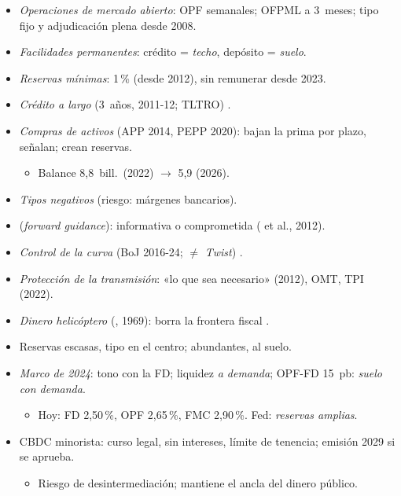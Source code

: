 \documentclass{article}
\begin{document}
\begin{columnas}
\begin{itemize}
\item \emph{Operaciones de mercado abierto}: OPF semanales; OFPML a 3~meses; tipo fijo y adjudicación plena desde 2008.
\item \emph{Facilidades permanentes}: crédito = \emph{techo}, depósito = \emph{suelo}.
\item \emph{Reservas mínimas}: 1\,\% (desde 2012), sin remunerar desde 2023.
\end{itemize}
\begin{itemize}
\item \emph{Crédito a largo} (3~años, 2011-12; TLTRO) .
\item \emph{Compras de activos} (APP 2014, PEPP 2020): bajan la prima por plazo, señalan; crean reservas.
  \begin{itemize}
  \item Balance 8,8~bill.\ (2022) $\to$ 5,9 (2026).
  \end{itemize}
\item \emph{Tipos negativos} (riesgo: márgenes bancarios).
\item {} (\emph{forward guidance}): informativa o comprometida ( et al., 2012).
\item \emph{Control de la curva} (BoJ 2016-24; $\neq$ \emph{Twist}) .
\item \emph{Protección de la transmisión}: «lo que sea necesario» (2012), OMT, TPI (2022).
\item \emph{Dinero helicóptero} (, 1969): borra la frontera fiscal .
\end{itemize}

\begin{itemize}
\item Reservas escasas, tipo en el centro; abundantes, al suelo.
\item \emph{Marco de 2024}: tono con la FD; liquidez \emph{a demanda}; OPF-FD 15~pb: \emph{suelo con demanda}.
  \begin{itemize}
  \item Hoy: FD 2,50\,\%, OPF 2,65\,\%, FMC 2,90\,\%. Fed: \emph{reservas amplias}.
  \end{itemize}
\end{itemize}
\begin{itemize}
\item CBDC minorista: curso legal, sin intereses, límite de tenencia; emisión 2029 si se aprueba.
  \begin{itemize}
  \item Riesgo de desintermediación; mantiene el ancla del dinero público.
  \end{itemize}
\end{itemize}


\end{columnas}
\end{document}
